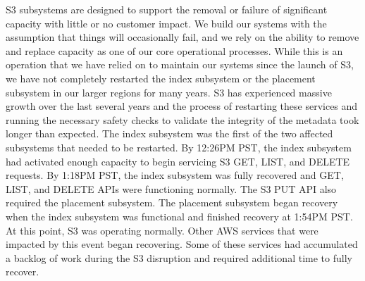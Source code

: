 \documentclass{report}
\begin{document}
\begin{spacing}{1.4}
\begin{enumerate}[leftmargin=*]
      S3 subsystems are designed to support the removal or failure of significant capacity with little or no customer impact. We build our systems with the assumption that things will occasionally fail, and we rely on the ability to remove and replace capacity as one of our core operational processes. While this is an operation that we have relied on to maintain our systems since the launch of S3, we have not completely restarted the index subsystem or the placement subsystem in our larger regions for many years. S3 has experienced massive growth over the last several years and the process of restarting these services and running the necessary safety checks to validate the integrity of the metadata took longer than expected. The index subsystem was the first of the two affected subsystems that needed to be restarted. By 12:26PM PST, the index subsystem had activated enough capacity to begin servicing S3 GET, LIST, and DELETE requests. By 1:18PM PST, the index subsystem was fully recovered and GET, LIST, and DELETE APIs were functioning normally.  The S3 PUT API also required the placement subsystem. The placement subsystem began recovery when the index subsystem was functional and finished recovery at 1:54PM PST. At this point, S3 was operating normally. Other AWS services that were impacted by this event began recovering. Some of these services had accumulated a backlog of work during the S3 disruption and required additional time to fully recover.



\end{enumerate}
\end{spacing}
\end{document}
